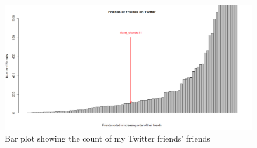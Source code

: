 \documentclass[letterpaper,11pt]{article}
\begin{document}
\clearpage
\begin{figure}[h]
\includegraphics[scale=0.3]{qn4/RGraph.png}
\caption{Bar plot showing the count of my Twitter friends' friends}
\label{fig:q4barplot}
\end{figure}


\newpage


\newpage




\clearpage


\end{document}
